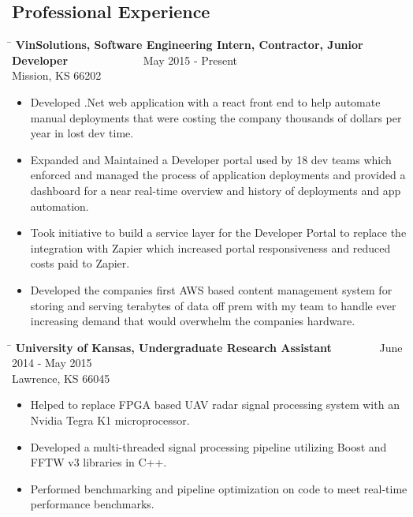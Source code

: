 \documentclass{res}
\begin{document}
\begin{resume}
\section{Professional Experience}
   \vspace{-0.1in}	
   \begin{tabbing}
   \hspace{5.5in}\= \kill 
    {\bf VinSolutions, Software Engineering Intern, Contractor, Junior Developer} \>~~~~~~~~~~~~~May 2015 - Present\\
    Mission, KS 66202
   \end{tabbing}\vspace{-10pt}
	\begin{itemize}
		\item Developed .Net web application with a react front end to help automate manual deployments that were costing the company thousands of dollars per year in lost dev time.
		\item Expanded and Maintained a Developer portal used by 18 dev teams which enforced and managed the process of application deployments and provided a dashboard for a near real-time overview and history of deployments and app automation.
		\item Took initiative to build a service layer for the Developer Portal to replace the integration with Zapier which increased portal responsiveness and reduced costs paid to Zapier.
		\item Developed the companies first AWS based content management system for storing and serving terabytes of data off prem with my team to handle ever increasing demand that would overwhelm the companies hardware. \vspace{-15pt}
	\end{itemize}
   \begin{tabbing}
   \hspace{5.5in}\= \kill
    {\bf University of Kansas, Undergraduate Research Assistant} \>~~~~~~~~June 2014 - May 2015\\
    Lawrence, KS 66045
   \end{tabbing}\vspace{-10pt}
	\begin{itemize}
		\item Helped to replace FPGA based UAV radar signal processing system with an Nvidia Tegra K1 microprocessor.
		\item Developed a multi-threaded signal processing pipeline utilizing Boost and FFTW v3 libraries in C++.
		\item Performed benchmarking and pipeline optimization on code to meet real-time performance benchmarks.\vspace{-15pt}

\end{itemize}
\end{resume}
\end{document}
